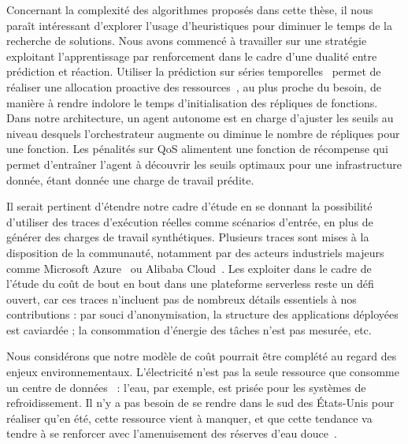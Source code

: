 Concernant la complexité des algorithmes proposés dans cette thèse, il nous paraît intéressant d'explorer l'usage d'heuristiques pour diminuer le temps de la recherche de solutions. Nous avons commencé à travailler sur une stratégie exploitant l'apprentissage par renforcement dans le cadre d'une dualité entre prédiction et réaction. Utiliser la prédiction sur séries temporelles~\cite{bauerTimeSeriesForecasting2020} permet de réaliser une allocation proactive des ressources~\cite{parkGraphNeuralNetworkBased2024}, au plus proche du besoin, de manière à rendre indolore le temps d'initialisation des répliques de fonctions. Dans notre architecture, un agent autonome est en charge d'ajuster les seuils au niveau desquels l'orchestrateur augmente ou diminue le nombre de répliques pour une fonction. Les pénalités sur \gls{QoS} alimentent une fonction de récompense qui permet d'entraîner l'agent à découvrir les seuils optimaux pour une infrastructure donnée, étant donnée une charge de travail prédite.



Il serait pertinent d'étendre notre cadre d'étude en se donnant la possibilité d'utiliser des traces d'exécution réelles comme scénarios d'entrée, en plus de générer des charges de travail synthétiques. Plusieurs traces sont mises à la disposition de la communauté, notamment par des acteurs industriels majeurs comme Microsoft Azure~\cite{cortezResourceCentralUnderstanding2017a} ou Alibaba Cloud~\cite{mahmoudiSimFaaSPerformanceSimulator2021}. Les exploiter dans le cadre de l'étude du coût de bout en bout dans une plateforme serverless reste un défi ouvert, car ces traces n'incluent pas de nombreux détails essentiels à nos contributions : par souci d'anonymisation, la structure des applications déployées est caviardée ; la consommation d'énergie des tâches n'est pas mesurée, etc.

Nous considérons que notre modèle de coût pourrait être complété au regard des enjeux environnementaux. L'électricité n'est pas la seule ressource que consomme un centre de données~\cite{rickeCountrylevelSocialCost2018} : l'eau, par exemple, est prisée pour les systèmes de refroidissement. Il n'y a pas besoin de se rendre dans le sud des États-Unis pour réaliser qu'en été, cette ressource vient à manquer, et que cette tendance va tendre à se renforcer avec l'amenuisement des réserves d'eau douce~\cite{EauAvecRessource2024}.

